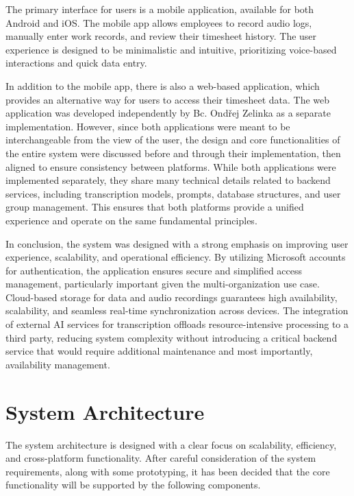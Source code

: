 \documentclass[
  digital,     %
  oneside,     %
  nosansbold,  %
  nocolorbold, %
  lof,         %
  lot,         %
]{fithesis4}
\begin{document}
\begin{markdown}
The primary interface for users is a mobile application, available for both Android and iOS. The mobile app allows employees to record audio logs, manually enter work records, and review their timesheet history. The user experience is designed to be minimalistic and intuitive, prioritizing voice-based interactions and quick data entry.

In addition to the mobile app, there is also a web-based application, which provides an alternative way for users to access their timesheet data. The web application was developed independently by Bc. Ondřej Zelinka as a separate implementation. However, since both applications were meant to be interchangeable from the view of the user, the design and core functionalities of the entire system were discussed before and through their implementation, then aligned to ensure consistency between platforms. While both applications were implemented separately, they share many technical details related to backend services, including transcription models, prompts, database structures, and user group management. This ensures that both platforms provide a unified experience and operate on the same fundamental principles.

In conclusion, the system was designed with a strong emphasis on improving user experience, scalability, and operational efficiency. By utilizing Microsoft accounts for authentication, the application ensures secure and simplified access management, particularly important given the multi-organization use case. Cloud-based storage for data and audio recordings guarantees high availability, scalability, and seamless real-time synchronization across devices. The integration of external AI services for transcription offloads resource-intensive processing to a third party, reducing system complexity without introducing a critical backend service that would require additional maintenance and most importantly, availability management.

\end{markdown}

\section{System Architecture}

The system architecture is designed with a clear focus on scalability, efficiency, and cross-platform functionality. After careful consideration of the system requirements, along with some prototyping, it has been decided that the core functionality will be supported by the following components.
\end{document}
